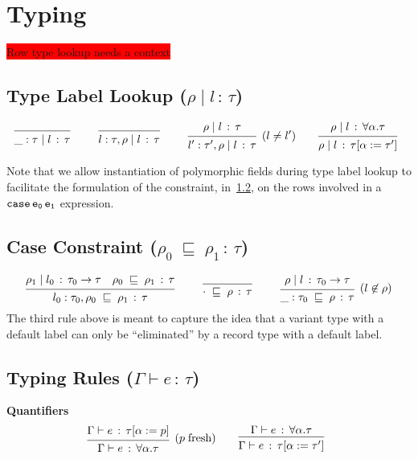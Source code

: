 \documentclass{article}
\newcommand{\todo}[1]{\colorbox{red}{#1}}
\newcommand{\G}{\Gamma}
\newcommand{\case}[2]{\tt{case}\,#1\,#2}
\newcommand{\hastp}[3]{#1 \vdash #2 \,:\, #3}
\newcommand{\haslbl}[3]{#1\;|\;#2\,:\, #3}
\newcommand{\caseVarRcd}[3]{#1 \;\sqsubseteq\; #2 \,:\, #3}
\newcommand{\deduct}[3][]
{
  \begin{prooftree}
    \hypo{#2}
    \infer1[\text{#1}]{#3}
  \end{prooftree}
}
\begin{document}
\section{Typing}

\todo{Row type lookup needs a context}

\subsection{Type Label Lookup \;($\haslbl{\rho}{l}{\tau}$)}
\label{subsec:type-lookup}
\[
\deduct
    {}
    {\haslbl{\_ : \tau}{l}{\tau}}
    {}
\qquad
\deduct
    {}
    {\haslbl{l:\tau,\rho}{l}{\tau}}
    {}
\qquad
\deduct
    {\haslbl{\rho}{l}{\tau}}
    {\haslbl{l':\tau',\rho}{l}{\tau}}
    {(l \neq l')}
\qquad
\deduct
    {\haslbl{\rho}{l}{\forall\alpha.\tau}}
    {\haslbl{\rho}{l}{\tau[\alpha := \tau']}}
    {}
\]

Note that we allow instantiation of polymorphic fields during type
label lookup to facilitate the formulation of the constraint, in~\ref{subsec:case-constraint}, on
the rows involved in a $\case{e_0}{e_1}$ expression.

\subsection{Case Constraint \;($\caseVarRcd{\rho_0}{\rho_1}{\tau}$)}
\label{subsec:case-constraint}
\[
\deduct
    {\haslbl{\rho_1}{l_0}{\tau_0\to\tau} \quad \caseVarRcd{\rho_0}{\rho_1}{\tau}}
    {\caseVarRcd{l_0:\tau_0,\rho_0}{\rho_1}{\tau}}
    {}
\qquad
\deduct
    {}
    {\caseVarRcd{\cdot}{\rho}{\tau}}
    {}
\qquad
\deduct
    {\haslbl{\rho}{l}{\tau_0\to\tau}}
    {\caseVarRcd{\_:\tau_0}{\rho}{\tau}}
    {(l\not\in\rho)}
\]
The third rule above is meant to capture the idea that a variant type
with a default label can only be ``eliminated'' by a record type with a
default label.

\subsection{Typing Rules \;($\hastp{\G}{e}{\tau}$)}

\textbf{Quantifiers}
\[
\deduct
    {\hastp{\G}{e}{\tau[\alpha := p]}}
    {\hastp{\G}{e}{\forall \alpha . \tau}}
    {(p\;\text{fresh})}
\qquad
\deduct
    {\hastp{\G}{e}{\forall \alpha.\tau}}
    {\hastp{\G}{e}{\tau[\alpha := \tau']}}
    {}
\]
\end{document}
